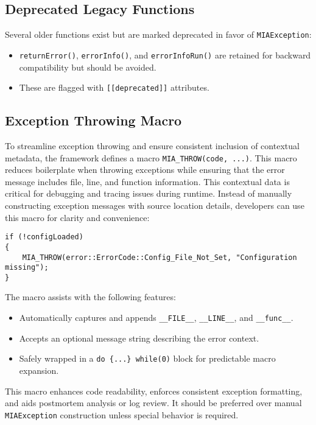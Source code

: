 \subsection*{Deprecated Legacy Functions}
Several older functions exist but are marked deprecated in favor of \texttt{MIAException}:
\begin{itemize}\itemsep0em
	\item \texttt{returnError()}, \texttt{errorInfo()}, and \texttt{errorInfoRun()} are retained for backward compatibility but should be avoided.
	\item These are flagged with \texttt{[[deprecated]]} attributes.
\end{itemize}


\subsection*{Exception Throwing Macro}
To streamline exception throwing and ensure consistent inclusion of contextual metadata, the framework defines a macro \texttt{MIA\_THROW(code, ...)}. This macro reduces boilerplate when throwing exceptions while ensuring that the error message includes file, line, and function information. This contextual data is critical for debugging and tracing issues during runtime. Instead of manually constructing exception messages with source location details, developers can use this macro for clarity and convenience:
\begin{lstlisting}[style=cppstyle]
if (!configLoaded)
{
    MIA_THROW(error::ErrorCode::Config_File_Not_Set, "Configuration missing");
}
\end{lstlisting}
The macro assists with the following features:
\begin{itemize}\itemsep0em
    \item Automatically captures and appends \texttt{\_\_FILE\_\_}, \texttt{\_\_LINE\_\_}, and \texttt{\_\_func\_\_}.
    \item Accepts an optional message string describing the error context.
    \item Safely wrapped in a \texttt{do \{...\} while(0)} block for predictable macro expansion.
\end{itemize}
This macro enhances code readability, enforces consistent exception formatting, and aids postmortem analysis or log review. It should be preferred over manual \texttt{MIAException} construction unless special behavior is required.



